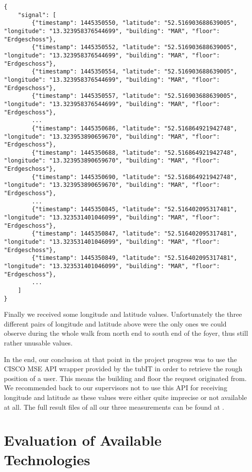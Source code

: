 \begin{lstlisting}
{
    "signal": [
        {"timestamp": 1445350550, "latitude": "52.516903688639005", "longitude": "13.323958376544699", "building": "MAR", "floor": "Erdgeschoss"},
        {"timestamp": 1445350552, "latitude": "52.516903688639005", "longitude": "13.323958376544699", "building": "MAR", "floor": "Erdgeschoss"},
        {"timestamp": 1445350554, "latitude": "52.516903688639005", "longitude": "13.323958376544699", "building": "MAR", "floor": "Erdgeschoss"},
        {"timestamp": 1445350557, "latitude": "52.516903688639005", "longitude": "13.323958376544699", "building": "MAR", "floor": "Erdgeschoss"},
        ...
        {"timestamp": 1445350686, "latitude": "52.516864921942748", "longitude": "13.323953890659670", "building": "MAR", "floor": "Erdgeschoss"},
        {"timestamp": 1445350688, "latitude": "52.516864921942748", "longitude": "13.323953890659670", "building": "MAR", "floor": "Erdgeschoss"},
        {"timestamp": 1445350690, "latitude": "52.516864921942748", "longitude": "13.323953890659670", "building": "MAR", "floor": "Erdgeschoss"},
        ...
        {"timestamp": 1445350845, "latitude": "52.516402095317481", "longitude": "13.323531401046099", "building": "MAR", "floor": "Erdgeschoss"},
        {"timestamp": 1445350847, "latitude": "52.516402095317481", "longitude": "13.323531401046099", "building": "MAR", "floor": "Erdgeschoss"},
        {"timestamp": 1445350849, "latitude": "52.516402095317481", "longitude": "13.323531401046099", "building": "MAR", "floor": "Erdgeschoss"},
        ...
    ]
}
\end{lstlisting}

Finally we received some longitude and latitude values. Unfortunately the three different pairs of longitude and latitude above were the only ones we could observe during the whole walk from north end to south end of the foyer, thus still rather unusable values.

In the end, our conclusion at that point in the project progress was to use the CISCO MSE API wrapper provided by the tubIT in order to retrieve the rough position of a user. This means the building and floor the request originated from. We recommended back to our supervisors not to use this API for receiving longitude and latitude as these values were either quite imprecise or not available at all. The full result files of all our three measurements can be found at \cite{ioslINavGitHub}.


\vspace{0.5cm}

\section{Evaluation of Available Technologies}